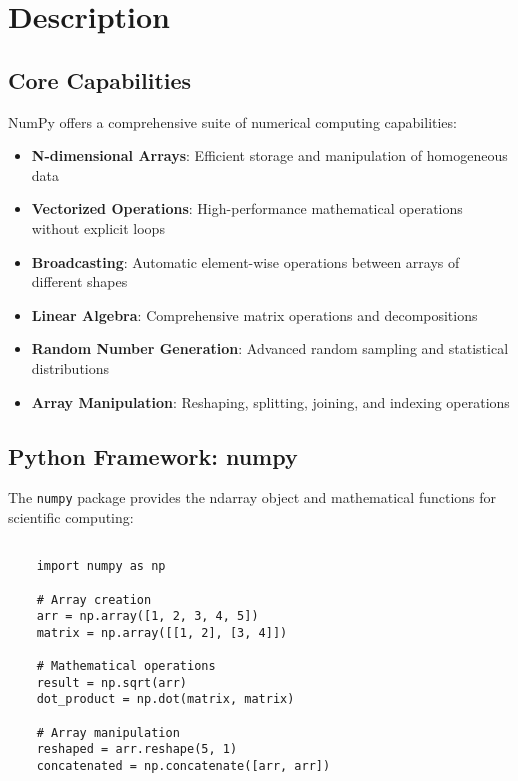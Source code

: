 \section{Description}
\label{sec:description}

\subsection{Core Capabilities}
\label{subsec:capabilities}

NumPy offers a comprehensive suite of numerical computing capabilities:

\begin{itemize}
	\item \textbf{N-dimensional Arrays}: Efficient storage and manipulation of homogeneous data
	\item \textbf{Vectorized Operations}: High-performance mathematical operations without explicit loops
	\item \textbf{Broadcasting}: Automatic element-wise operations between arrays of different shapes
	\item \textbf{Linear Algebra}: Comprehensive matrix operations and decompositions
	\item \textbf{Random Number Generation}: Advanced random sampling and statistical distributions
	\item \textbf{Array Manipulation}: Reshaping, splitting, joining, and indexing operations
\end{itemize}

\clearpage

\subsection{Python Framework: numpy}
\label{subsec:numpy}

The \texttt{numpy} package provides the ndarray object and mathematical functions for scientific computing:

\begin{lstlisting}[language=MyPython, caption={NumPy Core Operations}, label={lst:numpy_core}]
	
	import numpy as np
	
	# Array creation
	arr = np.array([1, 2, 3, 4, 5])
	matrix = np.array([[1, 2], [3, 4]])
	
	# Mathematical operations
	result = np.sqrt(arr)
	dot_product = np.dot(matrix, matrix)
	
	# Array manipulation
	reshaped = arr.reshape(5, 1)
	concatenated = np.concatenate([arr, arr])
	
\end{lstlisting}


